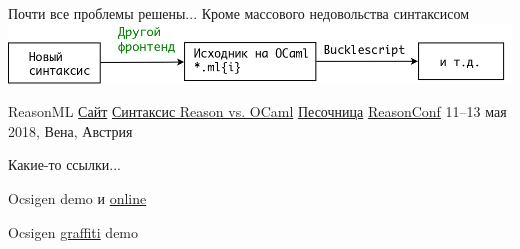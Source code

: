 \documentclass{beamer}
\theoremstyle{definition}
\newcommand{\faBad}{\textcolor{red}{\faThumbsODown}}
\begin{document}
\begin{frame}[fragile]{Почти все проблемы решены...}
\faBad Кроме массового недовольства синтаксисом 
\vskip15mm \pause
\includegraphics[width=.9\textwidth]{ReasonML.png}
\end{frame}

\begin{frame}[fragile]{ReasonML}
\href{https://reasonml.github.io/}{Сайт}
\vskip5mm
\href{https://reasonml.github.io/docs/en/comparison-to-ocaml.html}{Синтаксис Reason vs. OCaml}
\vskip5mm
\href{https://reasonml.github.io/en/try.html}{Песочница}
\vskip5mm
\href{https://www.reason-conf.com/}{ReasonConf} 11--13 мая 2018, Вена, Австрия
\end{frame}

\begin{frame}
\end{frame}


\begin{frame}{Какие-то ссылки...}
 
Ocsigen demo \href{http://ocsigen.org/ocsigen-start/demo}{\faGithub} и
\href{http://ocsigen.org/ocsigen-start/demo/}{online}

Ocsigen \href{http://ocsigen.org/graffiti/}{graffiti} demo \href{https://github.com/ocsigen/graffiti}{\faGithub}
\end{frame}
\end{document}
